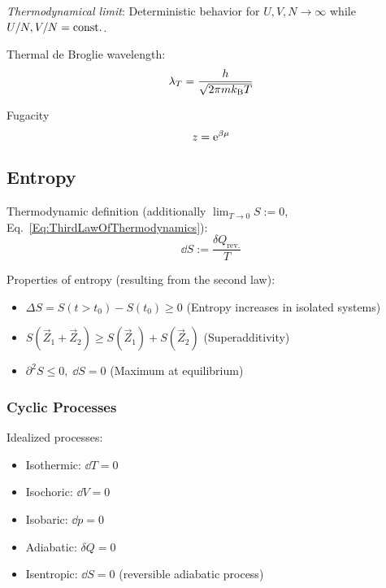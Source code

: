 		\emph{Thermodynamical limit}: \newline Deterministic behavior for $U,V,N\rightarrow\infty$ while $U/N,V/N=\mathrm{const.}$. \vsp
		
		\noindent
		Thermal de Broglie wavelength:
		\begin{equation}
			\lambda_T = \frac{h}{\sqrt{2\pi m k_{\text{B}} T}}
		\end{equation} \vsp

		\noindent
		Fugacity
		\begin{equation}
			z = \mathrm{e}^{\beta\mu}
		\end{equation} \vsp

	\subsection{Entropy}
		\noindent
		Thermodynamic definition (additionally $\lim_{T\rightarrow 0} S := 0$, Eq.~\ref{Eq:ThirdLawOfThermodynamics}):
		\begin{equation}
			\dd S := \frac{\delta Q_\text{rev.}}{T}
		\end{equation}

		\noindent
		Properties of entropy (resulting from the second law):
		\begin{itemize}\itemsep -0pt	%
			\item $\Delta S = S(t>t_0)-S(t_0) \ge 0$ \hfill{(Entropy increases in isolated systems)}
			\item $S(\vec{Z}_1 + \vec{Z}_2) \ge S(\vec{Z}_1) + S(\vec{Z}_2)$ \hfill{(Superadditivity)}
			\item $\partial^2 S \le 0,\;\dd S = 0$ \hfill{(Maximum at equilibrium)}
		\end{itemize}

		\subsubsection{Cyclic Processes}
			\noindent
			Idealized processes:
			\begin{itemize}
				\item Isothermic: $\dd T = 0$
				\item Isochoric: $\dd V = 0$
				\item Isobaric: $\dd p = 0$
				\item Adiabatic: $\delta Q = 0$
				\item Isentropic: $\dd S = 0$ (reversible adiabatic process)
			\end{itemize}

